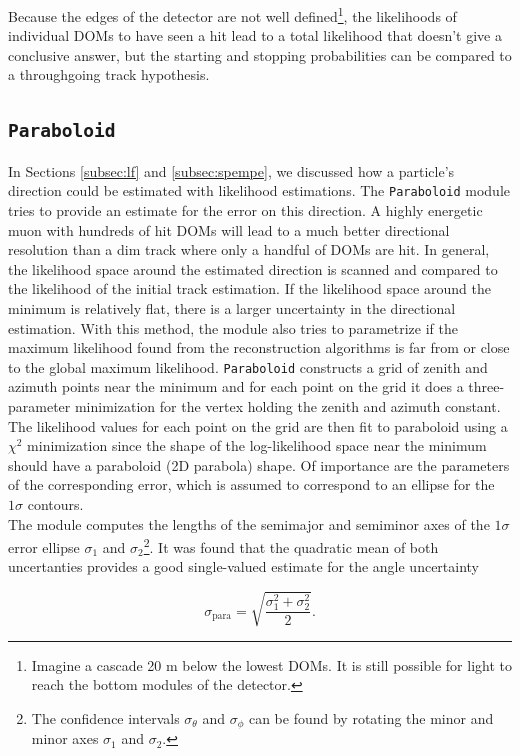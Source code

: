 Because the edges of the detector are not well defined\footnote{Imagine a cascade 20 m below the lowest DOMs. It is still possible for light to reach the bottom modules of the detector.}, the likelihoods of individual DOMs to have seen a hit lead to a total likelihood that doesn't give a conclusive answer, but the starting and stopping probabilities can be compared to a throughgoing track hypothesis.
\subsection{\texttt{Paraboloid}}
\label{subsec:paraboloid}

In Sections \ref{subsec:lf} and \ref{subsec:spempe}, we discussed how a particle's direction could be estimated with likelihood estimations. The \texttt{Paraboloid} module tries to provide an estimate for the error on this direction. A highly energetic muon with hundreds of hit DOMs will lead to a much better directional resolution than a dim track where only a handful of DOMs are hit. In general, the likelihood space around the estimated direction is scanned and compared to the likelihood of the initial track estimation. If the likelihood space around the minimum is relatively flat, there is a larger uncertainty in the directional estimation. With this method, the module also tries to parametrize if the maximum likelihood found from the reconstruction algorithms is far from or close to the global maximum likelihood. \texttt{Paraboloid} constructs a grid of zenith and azimuth points near the minimum and for each point on the grid it does a three-parameter minimization for the vertex holding the zenith and azimuth constant. The likelihood values for each point on the grid are then fit to paraboloid using a $\chi^2$ minimization since the shape of the log-likelihood space near the minimum should have a paraboloid (2D parabola) shape. Of importance are the parameters of the corresponding error, which is assumed to correspond to an ellipse for the $1\sigma$ contours.\\

\noindent The module computes the lengths of the semimajor and semiminor axes of the $1\sigma$ error ellipse $\sigma_1$ and $\sigma_2$\footnote{The confidence intervals $\sigma_\theta$ and $\sigma_\phi$ can be found by rotating the minor and minor axes $\sigma_1$ and $\sigma_2$.}. It was found that the quadratic mean of both uncertanties provides a good single-valued estimate for the angle uncertainty

\begin{equation}
\label{eq:paraboloid}
\sigma_\textrm{para} = \sqrt{\frac{\sigma_1^2 + \sigma_2^2}{2}}.
\end{equation}

